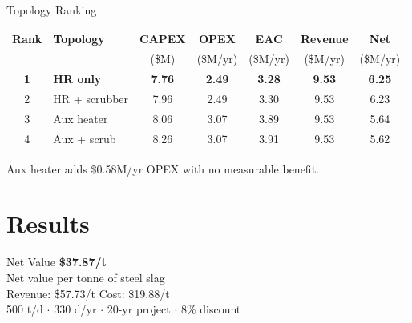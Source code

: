 \documentclass[aspectratio=169]{beamer}
\begin{document}
\begin{frame}{Topology Ranking}
\begin{table}
\centering
\small
\begin{tabular}{@{}clccccc@{}}
\toprule
\textbf{Rank} & \textbf{Topology} & \textbf{CAPEX} & \textbf{OPEX}
  & \textbf{EAC} & \textbf{Revenue} & \textbf{Net} \\
& & (\$M) & (\$M/yr) & (\$M/yr) & (\$M/yr) & (\$M/yr) \\
\midrule
\textbf{1} & \textbf{HR only} & \textbf{7.76} & \textbf{2.49} & \textbf{3.28}
  & \textbf{9.53} & \textcolor{revenue}{\textbf{6.25}} \\
2 & HR + scrubber & 7.96 & 2.49 & 3.30 & 9.53 & 6.23 \\
3 & Aux heater & 8.06 & 3.07 & 3.89 & 9.53 & 5.64 \\
4 & Aux + scrub & 8.26 & 3.07 & 3.91 & 9.53 & 5.62 \\
\bottomrule
\end{tabular}
\end{table}
\vspace{6pt}
\centering
\small Aux heater adds \$0.58M/yr OPEX with no measurable benefit.
\end{frame}

\section{Results}

\begin{frame}{Net Value}
\centering
\vspace{1.5cm}
{\Huge\textbf{\textcolor{revenue}{\$37.87/t}}}\\[14pt]
{\large Net value per tonne of steel slag}\\[12pt]
{\normalsize
\textcolor{revenue}{Revenue: \$57.73/t} \quad
\textcolor{cost}{Cost: \$19.88/t}}\\[6pt]
{\small 500 t/d $\cdot$ 330 d/yr $\cdot$ 20-yr project $\cdot$ 8\% discount}
\end{frame}
\end{document}
